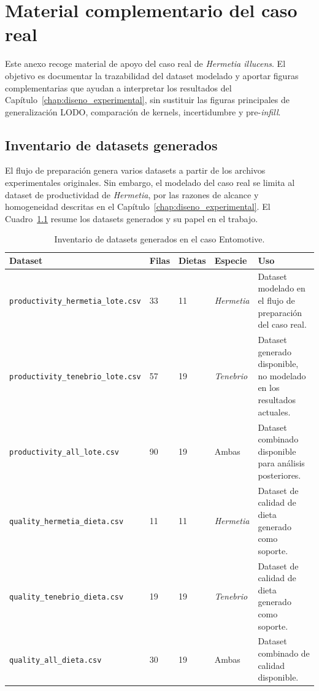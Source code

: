 \chapter{Material complementario del caso real}
\label{app:caso_real_complementario}

Este anexo recoge material de apoyo del caso real de \textit{Hermetia illucens}. El objetivo es documentar la trazabilidad del dataset modelado y aportar figuras complementarias que ayudan a interpretar los resultados del Capítulo~\ref{chap:diseno_experimental}, sin sustituir las figuras principales de generalización LODO, comparación de kernels, incertidumbre y pre-\emph{infill}.

\section{Inventario de datasets generados}
\label{app:inventario_datasets_entomotive}

El flujo de preparación genera varios datasets a partir de los archivos experimentales originales. Sin embargo, el modelado del caso real se limita al dataset de productividad de \textit{Hermetia}, por las razones de alcance y homogeneidad descritas en el Capítulo~\ref{chap:diseno_experimental}. El Cuadro~\ref{tab:app_inventory_entomotive} resume los datasets generados y su papel en el trabajo.

\begin{table}[htbp]
\centering
\small
\caption[Inventario de datasets Entomotive]{Inventario de datasets generados en el caso Entomotive.}
\label{tab:app_inventory_entomotive}
\renewcommand{\arraystretch}{1.15}
\begin{tabularx}{\textwidth}{@{}p{5.3cm} p{1.4cm} p{1.7cm} p{2cm} X@{}}
\toprule
\textbf{Dataset} & \textbf{Filas} & \textbf{Dietas} & \textbf{Especie} & \textbf{Uso} \\
\midrule
\texttt{productivity\_hermetia\_lote.csv} & 33 & 11 & \textit{Hermetia} & Dataset modelado en el flujo de preparación del caso real. \\
\texttt{productivity\_tenebrio\_lote.csv} & 57 & 19 & \textit{Tenebrio} & Dataset generado disponible, no modelado en los resultados actuales. \\
\texttt{productivity\_all\_lote.csv} & 90 & 19 & Ambas & Dataset combinado disponible para análisis posteriores. \\
\texttt{quality\_hermetia\_dieta.csv} & 11 & 11 & \textit{Hermetia} & Dataset de calidad de dieta generado como soporte. \\
\texttt{quality\_tenebrio\_dieta.csv} & 19 & 19 & \textit{Tenebrio} & Dataset de calidad de dieta generado como soporte. \\
\texttt{quality\_all\_dieta.csv} & 30 & 19 & Ambas & Dataset combinado de calidad disponible. \\
\bottomrule
\end{tabularx}
\end{table}
\FloatBarrier

